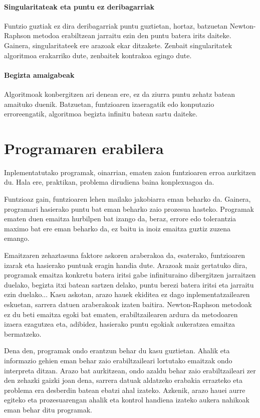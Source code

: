 \documentclass[10pt,a4paper,basque]{article}
\begin{document}
\paragraph{Singularitateak eta puntu ez deribagarriak}

Funtzio guztiak ez dira deribagarriak puntu guztietan, hortaz, batzuetan Newton-Raphson metodoa erabiltzean jarraitu ezin den puntu batera irits daiteke. Gainera, singularitateek ere arazoak ekar ditzakete. Zenbait singularitatek algoritmoa erakarriko dute, zenbaitek kontrakoa egingo dute.

\paragraph{Begizta amaigabeak}

Algoritmoak konbergitzen ari denean ere, ez da ziurra puntu zehatz batean amaituko duenik. Batzuetan, funtzioaren izaeragatik edo konputazio erroreengatik, algoritmoa begizta infinitu batean sartu daiteke.

\section{Programaren erabilera}

Inplementatutako programak, oinarrian, ematen zaion funtzioaren erroa aurkitzen du. Hala ere, praktikan, problema dirudiena baina konplexuagoa da.

Funtzioaz gain, funtzioaren lehen mailako jakobiarra eman beharko da. Gainera, programari hasierako puntu bat eman beharko zaio prozesua hasteko. Programak ematen duen emaitza hurbilpen bat izango da, beraz, errore edo tolerantzia maximo bat ere eman beharko da, ez baitu ia inoiz emaitza guztiz zuzena emango.

Emaitzaren zehaztasuna faktore askoren araberakoa da, esaterako, funtzioaren izarak eta hasierako puntuak eragin handia dute. Arazoak maiz gertatuko dira, programak emaitza konkretu batera iritsi gabe infinituraino dibergitzen jarraitzen duelako, begizta itxi batean sartzen delako, puntu berezi batera iritsi eta jarraitu ezin duelako... Kasu askotan, arazo hauek ekiditea ez dago inplementatzailearen eskuetan, sarrera datuen araberakoak izaten baitira. Newton-Raphson metodoak ez du beti emaitza egoki bat ematen, erabiltzailearen ardura da metodoaren izaera ezagutzea eta, adibidez, hasierako puntu egokiak aukeratzea emaitza bermatzeko.

Dena den, programak ondo erantzun behar du kasu guztietan. Ahalik eta informazio gehien eman behar zaio erabiltzaileari lortutako emaitzak ondo interpreta ditzan. Arazo bat aurkitzean, ondo azaldu behar zaio erabiltzaileari zer den zehazki gaizki joan dena, sarrera datuak aldatzeko erabakia errazteko eta problema era desberdin batean ebatzi ahal izateko. Azkenik, arazo hauei aurre egiteko eta prozesuarengan ahalik eta kontrol handiena izateko aukera nahikoak eman behar ditu programak.
\end{document}
